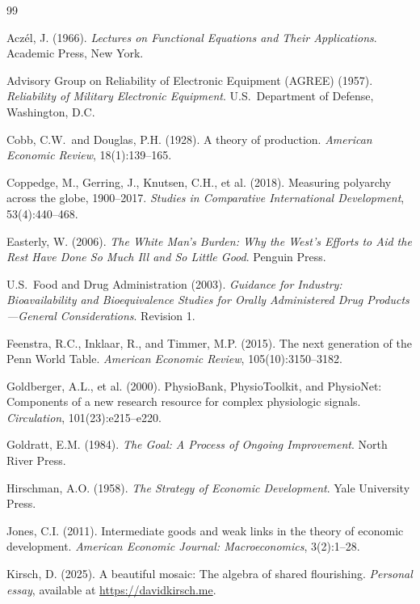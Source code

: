 \documentclass[12pt, a4paper]{article}
\theoremstyle{definition}
\theoremstyle{remark}
\begin{document}
\begin{thebibliography}{99}

Acz\'el, J. (1966). \textit{Lectures on Functional Equations and Their Applications}. Academic Press, New York.

Advisory Group on Reliability of Electronic Equipment (AGREE) (1957). \textit{Reliability of Military Electronic Equipment}. U.S.\ Department of Defense, Washington, D.C.

Cobb, C.W.\ and Douglas, P.H. (1928). A theory of production. \textit{American Economic Review}, 18(1):139--165.

Coppedge, M., Gerring, J., Knutsen, C.H., et al. (2018). Measuring polyarchy across the globe, 1900--2017. \textit{Studies in Comparative International Development}, 53(4):440--468.

Easterly, W. (2006). \textit{The White Man's Burden: Why the West's Efforts to Aid the Rest Have Done So Much Ill and So Little Good}. Penguin Press.

U.S.\ Food and Drug Administration (2003). \textit{Guidance for Industry: Bioavailability and Bioequivalence Studies for Orally Administered Drug Products---General Considerations}. Revision 1.

Feenstra, R.C., Inklaar, R., and Timmer, M.P. (2015). The next generation of the Penn World Table. \textit{American Economic Review}, 105(10):3150--3182.

Goldberger, A.L., et al. (2000). PhysioBank, PhysioToolkit, and PhysioNet: Components of a new research resource for complex physiologic signals. \textit{Circulation}, 101(23):e215--e220.

Goldratt, E.M. (1984). \textit{The Goal: A Process of Ongoing Improvement}. North River Press.

Hirschman, A.O. (1958). \textit{The Strategy of Economic Development}. Yale University Press.

Jones, C.I. (2011). Intermediate goods and weak links in the theory of economic development. \textit{American Economic Journal: Macroeconomics}, 3(2):1--28.

Kirsch, D. (2025). A beautiful mosaic: The algebra of shared flourishing. \textit{Personal essay}, available at \url{https://davidkirsch.me}.


\end{thebibliography}
\end{document}
